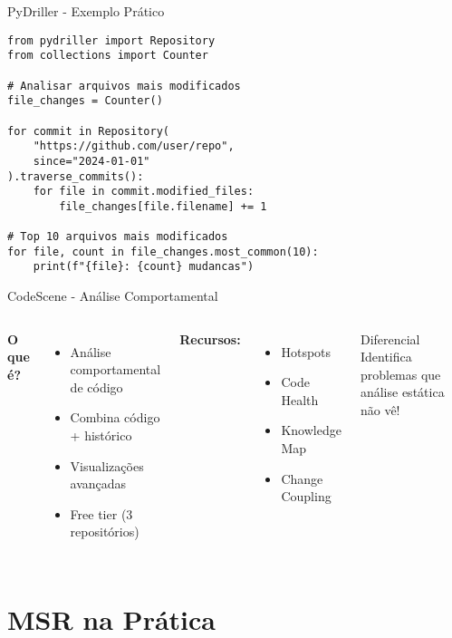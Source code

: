 \documentclass[aspectratio=169,11pt]{beamer}
\begin{document}
\begin{frame}[fragile]{PyDriller - Exemplo Prático}
\begin{lstlisting}[style=pythoncode,basicstyle=\ttfamily\scriptsize]
from pydriller import Repository
from collections import Counter

# Analisar arquivos mais modificados
file_changes = Counter()

for commit in Repository(
    "https://github.com/user/repo", 
    since="2024-01-01"
).traverse_commits():
    for file in commit.modified_files:
        file_changes[file.filename] += 1

# Top 10 arquivos mais modificados
for file, count in file_changes.most_common(10):
    print(f"{file}: {count} mudancas")
\end{lstlisting}
\end{frame}

\begin{frame}{CodeScene - Análise Comportamental}
\begin{columns}[T]
\textbf{O que é?}
\begin{itemize}
    \item Análise comportamental de código
    \item Combina código + histórico
    \item Visualizações avançadas
    \item Free tier (3 repositórios)
\end{itemize}

\textbf{Recursos:}
\begin{itemize}
    \item Hotspots
    \item Code Health
    \item Knowledge Map
    \item Change Coupling
\end{itemize}

\begin{alertblock}{Diferencial}
Identifica problemas que análise estática não vê!
\end{alertblock}
\end{columns}
\end{frame}

\section{MSR na Prática}
\end{document}
